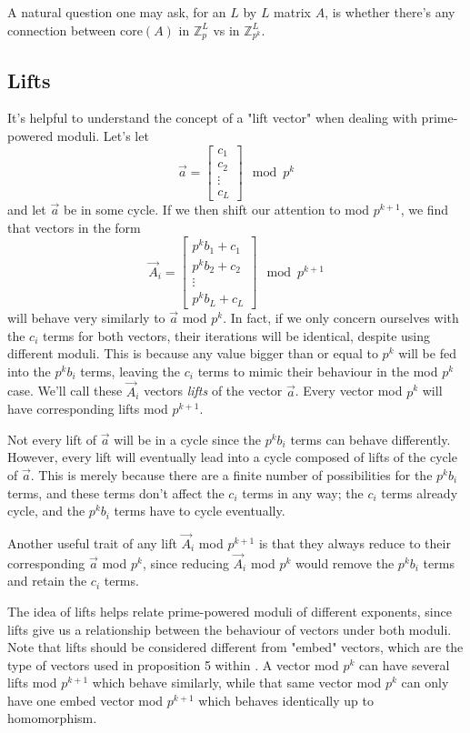 \documentclass[a4paper, 12pt, reqno]{amsart}
\newcommand{\ssubsection}[1]{\vspace{0.25cm}\subsection{#1}}
\begin{document}
	A natural question one may ask, for an $L$ by $L$ matrix $A$, is whether there's any connection between
	core$(A)$ in $\mathds{Z}_{p}^{L}$ vs in $\mathds{Z}_{p^k}^{L}$.
	
	\ssubsection{Lifts}
	It's helpful to understand the concept of a "lift vector" when dealing with prime-powered moduli.
	Let's let
	\[
		\vec{a} = 
		\begin{bmatrix}
			c_{1}  \\
			c_{2}  \\
			\vdots \\
			c_{L}
		\end{bmatrix} \mod{p^k}
	\]
	and let $\vec{a}$ be in some cycle. If we then shift our attention to mod $p^{k+1}$, we find that
	vectors in the form
	\[
		\vec{A}_{i} = 
		\begin{bmatrix}
			p^{k}b_{1} + c_{1} \\
			p^{k}b_{2} + c_{2} \\
			\vdots             \\
			p^{k}b_{L} + c_{L}
		\end{bmatrix} \mod{p^{k+1}}
	\]
	will behave very similarly to $\vec{a}$ mod $p^{k}$. In fact, if we only concern ourselves with the
	$c_i$ terms for both vectors, their iterations will be identical, despite using different moduli.
	This is because any value bigger than or equal to $p^k$ will be fed into the $p^{k}b_{i}$ terms,
	leaving the $c_i$ terms to mimic their behaviour in the mod $p^k$ case. We'll call these $\vec{A}_{i}$ 
	vectors \emph{lifts} of the vector $\vec{a}$. Every vector mod $p^k$ will have corresponding lifts
	mod $p^{k+1}$.
	
	Not every lift of $\vec{a}$ will be in a cycle since the $p^{k}b_{i}$ terms can behave differently.
	However, every lift will eventually lead into a cycle composed of lifts of the cycle of $\vec{a}$. 
	This is merely because there are a finite number of possibilities for the $p^{k}b_{i}$ terms, and 
	these terms don't affect the $c_i$ terms in any way; the $c_i$ terms already cycle, and the $p^{k}b_i$ 
	terms have to cycle eventually.
	
	Another useful trait of any lift $\vec{A}_i$ mod $p^{k+1}$ is that they always reduce to their corresponding
	$\vec{a}$ mod $p^k$, since reducing $\vec{A}_i$ mod $p^k$ would remove the $p^{k}b_i$ terms and retain
	the $c_i$ terms.
	
	The idea of lifts helps relate prime-powered moduli of different exponents, since lifts give us a
	relationship between the behaviour of vectors under both moduli. Note that lifts should be considered
	different from "embed" vectors, which are the type of vectors used in proposition 5 within \citet{Mendivil2012}.
	A vector mod $p^k$ can have several lifts mod $p^{k+1}$ which behave similarly, while that same vector
	mod $p^k$ can only have one embed vector mod $p^{k+1}$ which behaves identically up to homomorphism.
	
\end{document}
